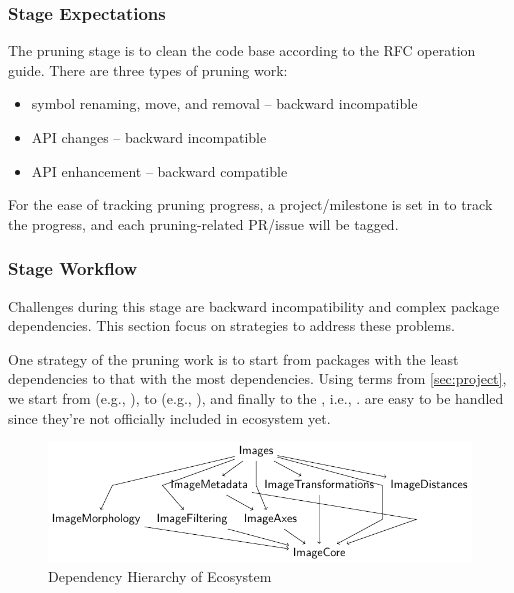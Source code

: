\subsubsection*{Stage Expectations}

The pruning stage is to clean the code base according to the RFC operation guide. There are three types of pruning work:
\begin{itemize}
    \item symbol renaming, move, and removal -- backward incompatible
    \item API changes -- backward incompatible
    \item API enhancement -- backward compatible
\end{itemize}
For the ease of tracking pruning progress, a project/milestone is set in \repoimages{} to track the progress, and each pruning-related PR/issue will be tagged. \par

\subsubsection*{Stage Workflow}

Challenges during this stage are backward incompatibility and complex package dependencies. This section focus on strategies to address these problems. \par

One strategy of the pruning work is to start from packages with the least dependencies to that with the most dependencies. Using terms from \cref{sec:project}, we start from  (e.g., \repoimagecore{}), to  (e.g., \repoimagetransformations{}), and finally to the , i.e., \repoimages{}.  are easy to be handled since they're not officially included in \images{} ecosystem yet. \par

\begin{figure}[htbp]
\caption{Dependency Hierarchy of \images{} Ecosystem}
  \centering
  \includegraphics[width=\textwidth]{figures/images_dep.pdf}
\end{figure}

